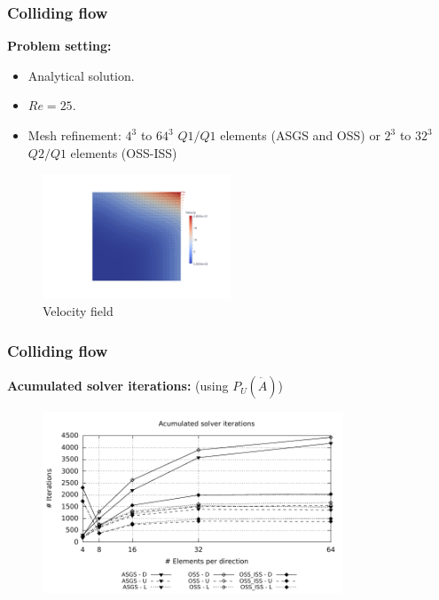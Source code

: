 \begin{frame}
  \frametitle{Colliding flow}
  \textbf{Problem setting:}
  \begin{itemize}
    \itemsep-0.10cm
 	\item Analytical solution.
  	\item $Re=25$. 
  	\item Mesh refinement: $ 4^3 $ to $ 64^3 $ $ Q1/Q1 $ elements (ASGS and OSS) or $ 2^3 $ to $ 32^3 $$ Q2/Q1 $ elements (OSS-ISS)
  \end{itemize}
  \vspace*{-0.3cm}
  \begin{figure}
    \centering	
    \includegraphics[trim=10cm 3.5cm 5cm 3cm, clip=true, width=0.5\textwidth]{Figures/colliding_flow.pdf}
	\vspace*{-0.2cm}
	\caption{Velocity field}
  \end{figure}
\end{frame}
\begin{frame}
 \frametitle{Colliding flow}
 \textbf{Acumulated solver iterations:} (using $ P_U(\overset{\tilde{}}{A}) $)
  \vspace*{-0.3cm}
 \begin{figure}
     \centering	
     \includegraphics[width=0.8\textwidth]{Figures/colliding_iter.pdf}
   \end{figure}
 \begin{overlayarea}{\textwidth}{1.5cm}
  \end{overlayarea}
\end{frame}
